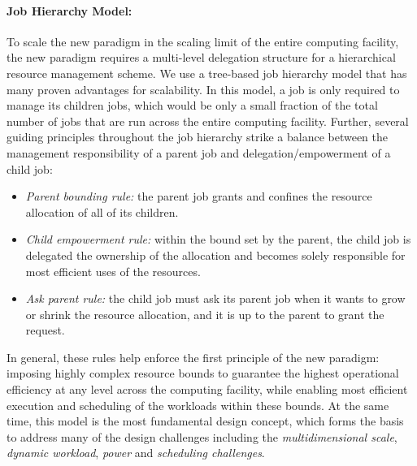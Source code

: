 \documentclass{article}
\begin{document}
\paragraph{Job Hierarchy Model:}
To scale the new paradigm in the scaling limit of the entire computing facility,
the new paradigm requires a multi-level delegation structure for a hierarchical 
resource management scheme. We use a tree-based job hierarchy model
that has many proven advantages for scalability. 
In this model, a job is only required to manage its children jobs,
which would be only a small fraction of the total number of jobs that are run
across the entire computing facility. Further, several guiding principles
throughout the job hierarchy strike a balance between the management
responsibility of a parent job and delegation/empowerment of a child job:
\begin{itemize}
\item{\sl Parent bounding rule:} the parent job grants and confines
     the resource allocation of all of its children.
\item{\sl Child empowerment rule:} within the bound set by the parent,
     the child job is delegated the ownership of the allocation
     and becomes solely responsible for most efficient uses of the resources.
\item{\sl Ask parent rule:} the child job must ask its parent job
     when it wants to grow or shrink the resource allocation, 
     and it is up to the parent to grant the request.                   
\end{itemize}
In general, these rules help enforce the first principle of the new paradigm: 
imposing highly complex resource bounds to guarantee the highest operational efficiency
at any level across the computing facility, while enabling most efficient execution
and scheduling of the workloads within these bounds.
At the same time, this model is the most fundamental design concept,
which forms the basis to address many of the design challenges including 
the {\sl multidimensional scale}, {\sl dynamic workload}, {\sl power} and
{\sl scheduling challenges}. 
\end{document}
